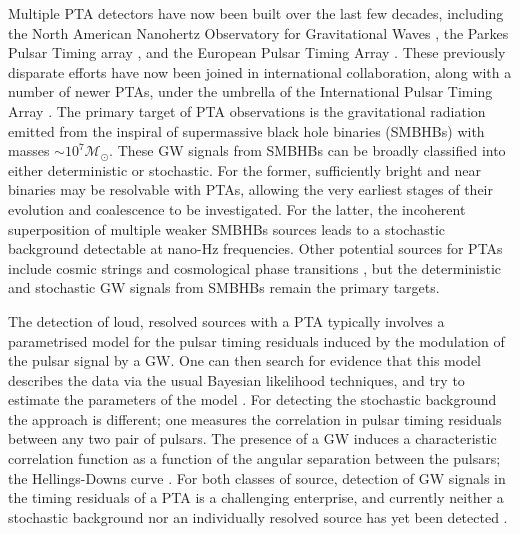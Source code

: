 \documentclass[fleqn,usenatbib,useAMS]{mnras}
\begin{document}
\noindent Multiple PTA detectors have now been built over the last few decades, including the North American Nanohertz Observatory for Gravitational Waves \citep[NANOGrav,][]{2020ApJ...905L..34A}, the Parkes Pulsar Timing array \citep[PPTA][]{2020PASA...37...20K}, and the European Pulsar Timing Array \citep[EPTA,][]{2010CQGra..27h4014F}. These previously disparate efforts have now been joined in international collaboration, along with a number of newer PTAs, under the umbrella of the International Pulsar Timing Array \citep[IPTA][]{2019MNRAS.490.4666P}. The primary target of PTA observations is the gravitational radiation emitted from the inspiral of supermassive black hole binaries (SMBHBs) with masses $\sim\mathcal{ 10^7 M_{\odot}}$. These GW signals from SMBHBs can be broadly classified into either deterministic or stochastic. For the former, sufficiently bright and near binaries may be resolvable with PTAs, allowing the very earliest stages of their evolution and coalescence to be investigated. For the latter, the incoherent superposition of multiple weaker SMBHBs sources leads to a stochastic background detectable at nano-Hz frequencies. Other potential sources for PTAs include cosmic strings \citep[e.g.][]{PTAstring} and cosmological phase transitions \citep[e.g.][]{PTAphase}, but the deterministic and stochastic GW signals from SMBHBs remain the primary targets. \newline 

\noindent The detection of loud, resolved sources with a PTA typically involves a parametrised model for the pulsar timing residuals induced by the modulation of the pulsar signal by a GW. One can then search for evidence that this model describes the data via the usual Bayesian likelihood techniques, and try to estimate the parameters of the model \citep[e.g.][]{Babak2016}. For detecting the stochastic background the approach is different; one measures the correlation in pulsar timing residuals between any two pair of pulsars. The presence of a GW induces a characteristic correlation function as a function of the angular separation between the pulsars; the Hellings-Downs curve \citep{Hellings}. For both classes of source, detection of GW signals in the timing residuals of a PTA is a challenging enterprise, and currently neither a stochastic background nor an individually resolved source has yet been detected \citep{2022MNRAS.510.4873A, 10.1093/nsr/nwx126}. \newline 
\end{document}
